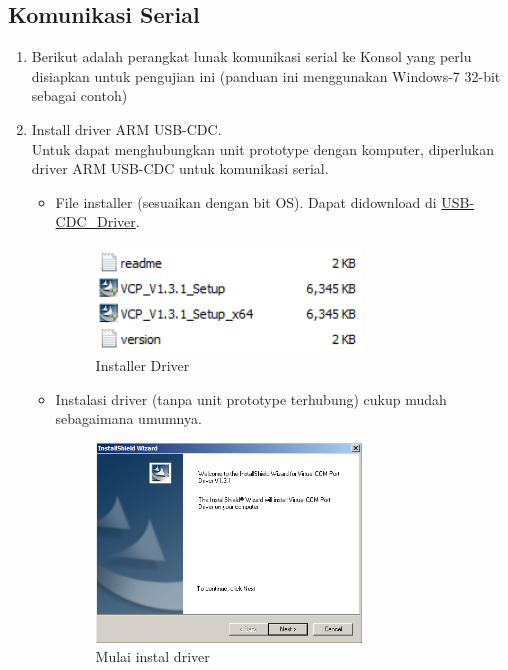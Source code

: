 \documentclass{article}
\begin{document}
	\newpage
	\subsection{Komunikasi Serial}
	
	\begin{enumerate}
		\item Berikut adalah perangkat lunak komunikasi serial ke Konsol yang perlu disiapkan untuk pengujian ini (panduan ini menggunakan Windows-7 32-bit sebagai contoh)
		
		\item Install driver ARM USB-CDC.\\
		Untuk dapat menghubungkan unit prototype dengan komputer,
		diperlukan driver ARM USB-CDC untuk komunikasi serial.
		
		\begin{itemize}
			\item File installer (sesuaikan dengan bit OS).
			Dapat didownload di \href{https://drive.google.com/drive/folders/19gXVrxR68SFHQUGGGgKb0Da03oV7Rh41?usp=share_link}{USB-CDC\_Driver}.
			\begin{figure}[H]
				\centering
				\includegraphics[width=200pt]{images/software/driver}
				\caption{Installer Driver}
			\end{figure}
			
			\item Instalasi driver (tanpa unit prototype terhubung) cukup mudah sebagaimana umumnya.
			\begin{figure}[H]
				\centering
				\includegraphics[width=200pt]{images/software/install_driver}
				\caption{Mulai instal driver}
			\end{figure}
		\end{itemize}
		

\end{enumerate}
\end{document}
